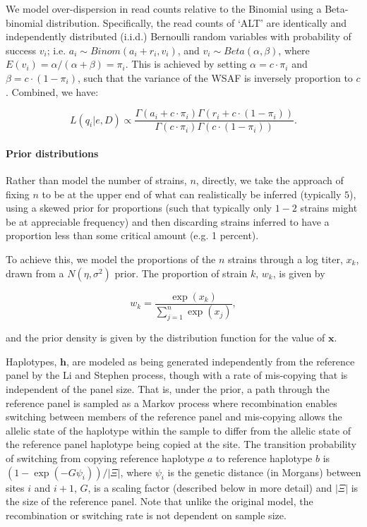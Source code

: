 \documentclass{nature}
\begin{document}
\noindent We model over-dispersion in read counts relative to the Binomial using a Beta-binomial distribution. Specifically, the read counts of `ALT' are identically and independently distributed (i.i.d.) Bernoulli random variables with probability of success $v_i$; i.e. $a_i \sim Binom(a_i + r_i, v_i)$, and $v_i \sim Beta(\alpha, \beta)$, where $E(v_i) = \alpha/(\alpha+\beta) = \pi_{i}$. This is achieved by setting $\alpha = c\cdot \pi_{i} $ and $\beta = c\cdot (1-\pi_{i})$, such that the variance of the WSAF is inversely proportion to $c$.  Combined, we have:

\begin{equation}
L(q_{i}| e, D) \propto \frac{\Gamma(a_i + c\cdot \pi_{i}) \Gamma(r_i + c\cdot (1-\pi_{i}))}{\Gamma(c\cdot \pi_{i})\Gamma(c\cdot (1-\pi_{i}))}. \label{eqn:llk}
\end{equation}


\paragraph{Prior distributions}

Rather than model the number of strains, $n$, directly, we take the approach of fixing $n$ to be at the upper end of what can realistically be inferred (typically $5$), using a skewed prior for proportions (such that typically only $1-2$ strains might be at appreciable frequency) and then discarding strains inferred to have a proportion less than some critical amount (e.g. 1 percent).

To achieve this, we model the proportions of the $n$ strains through a log titer, $x_k$, drawn from a $N(\eta, \sigma^2)$ prior.  The proportion of strain $k$, $w_k$, is given by

\begin{equation}
w_k = \frac{\exp(x_k)}{\sum_{j=1}^n \exp(x_j)},
\end{equation}

\noindent and the prior density is given by the distribution function for the value of $\mathbf{x}$.

Haplotypes, $\mathbf{h}$, are modeled as being generated independently from the reference panel by the Li and Stephen process\cite{Li2003}, though with a rate of mis-copying that is independent of the panel size. That is, under the prior, a path through the reference panel is sampled as a Markov process where recombination enables switching between members of the reference panel and mis-copying allows the allelic state of the haplotype within the sample to differ from the allelic state of the reference panel haplotype being copied at the site.  The transition probability of switching from copying reference haplotype $a$ to reference haplotype $b$ is $(1-\exp(-G \psi_i))/|\Xi|$, where $\psi_i$ is the genetic distance (in Morgans) between sites $i$ and $i+1$, $G$, is a scaling factor (described below in more detail) and $|\Xi|$ is the size of the reference panel.  Note that unlike the original model, the recombination or switching rate is not dependent on sample size.
\end{document}
